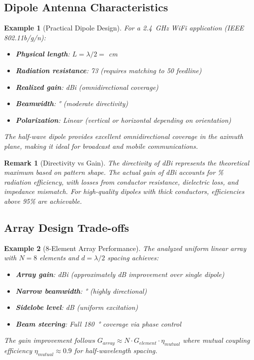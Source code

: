 \documentclass[a4paper, 11pt]{article}
\newtheorem{example}{Example}[section]
\newtheorem{remark}{Remark}[section]
\begin{document}
\subsection{Dipole Antenna Characteristics}

\begin{example}[Practical Dipole Design]
For a \SI{2.4}{GHz} WiFi application (IEEE 802.11b/g/n):
\begin{itemize}
\item \textbf{Physical length}: $L = \lambda/2 = $  cm
\item \textbf{Radiation resistance}: \SI{73}{\Omega} (requires matching to \SI{50}{\Omega} feedline)
\item \textbf{Realized gain}:  dBi (omnidirectional coverage)
\item \textbf{Beamwidth}: \si{\degree} (moderate directivity)
\item \textbf{Polarization}: Linear (vertical or horizontal depending on orientation)
\end{itemize}
The half-wave dipole provides excellent omnidirectional coverage in the azimuth plane, making it ideal for broadcast and mobile communications.
\end{example}

\begin{remark}[Directivity vs Gain]
The directivity of  dBi represents the theoretical maximum based on pattern shape. The actual gain of  dBi accounts for \% radiation efficiency, with losses from conductor resistance, dielectric loss, and impedance mismatch. For high-quality dipoles with thick conductors, efficiencies above 95\% are achievable.
\end{remark}

\subsection{Array Design Trade-offs}

\begin{example}[8-Element Array Performance]
The analyzed uniform linear array with $N = 8$ elements and $d = \lambda/2$ spacing achieves:
\begin{itemize}
\item \textbf{Array gain}:  dBi (approximately  dB improvement over single dipole)
\item \textbf{Narrow beamwidth}: \si{\degree} (highly directional)
\item \textbf{Sidelobe level}:  dB (uniform excitation)
\item \textbf{Beam steering}: Full \SI{180}{\degree} coverage via phase control
\end{itemize}
The gain improvement follows $G_{array} \approx N \cdot G_{element} \cdot \eta_{mutual}$ where mutual coupling efficiency $\eta_{mutual} \approx 0.9$ for half-wavelength spacing.
\end{example}
\end{document}
